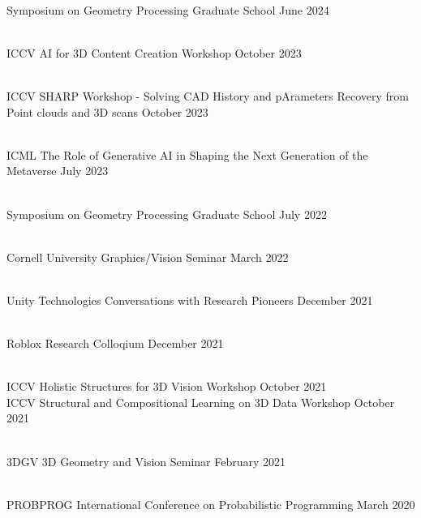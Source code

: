 \documentclass[line,margin]{res}
\begin{document}
\begin{resume}
\\
\talk
	{Symposium on Geometry Processing}
	{Graduate School}
	{June 2024}

\\
\talk
	{ICCV}
	{AI for 3D Content Creation Workshop}
	{October 2023}

\\
\talk
	{ICCV}
	{SHARP Workshop - Solving CAD History and pArameters Recovery from Point clouds and 3D scans}
	{October 2023}

\\
\talk
	{ICML}
	{The Role of Generative AI in Shaping the Next Generation of the Metaverse}
	{July 2023}

\\
\talk
	{Symposium on Geometry Processing}
	{Graduate School}
	{July 2022}

\\
\talk
	{Cornell University}
	{Graphics/Vision Seminar}
	{March 2022}

\\
\talk
	{Unity Technologies}
	{Conversations with Research Pioneers}
	{December 2021}

\\
\talk
	{Roblox}
	{Research Colloqium}
	{December 2021}

\\
\talk
	{ICCV}
	{Holistic Structures for 3D Vision Workshop}
	{October 2021}
\\
\talk
	{ICCV}
	{Structural and Compositional Learning on 3D Data Workshop}
	{October 2021}

\\
\talk
	{3DGV}
	{3D Geometry and Vision Seminar}
	{February 2021}

\\
\talk
	{PROBPROG}
	{International Conference on Probabilistic Programming}
	{March 2020}


\end{resume}
\end{document}
